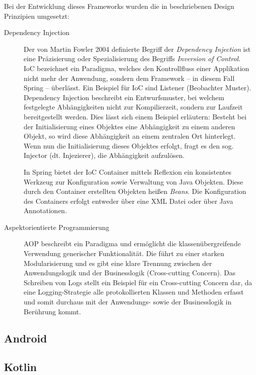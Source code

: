 			Bei der Entwicklung dieses Frameworks wurden die in \cite{Johnson.2003} beschriebenen Design Prinzipien umgesetzt:
			\begin{description}
				\item[Dependency Injection] 
					Der von Martin Fowler 2004 definierte Begriff der \textit{Dependency Injection} ist eine Präzisierung oder Spezialisierung des Begriffs \textit{Inversion of Control}. IoC bezeichnet ein Paradigma, welches den Kontrollfluss einer Applikation nicht mehr der Anwendung, sondern dem Framework -- in diesem Fall Spring -- überlässt. Ein Beispiel für IoC sind Listener (Beobachter Muster). \\
					Dependency Injection beschreibt ein Entwurfsmuster, bei welchem festgelegte Abhängigkeiten nicht zur Kompilierzeit, sondern zur Laufzeit bereitgestellt werden. Dies lässt sich einem Beispiel erläutern: Besteht bei der Initialisierung eines Objektes eine Abhängigkeit zu einem anderen Objekt, so wird diese Abhängigkeit an einem zentralen Ort hinterlegt. Wenn nun die Initialisierung dieses Objektes erfolgt, fragt es den sog. Injector (dt. Injezierer), die Abhängigkeit aufzulösen. \cite{MartinFowler.23.01.2020}
					
					In Spring bietet der IoC Container mittels Reflexion ein konsistentes Werkzeug zur Konfiguration sowie Verwaltung von Java Objekten. Diese durch den Container erstellten Objekten heißen \textit{Beans}. Die Konfiguration des Containers erfolgt entweder über eine XML Datei oder über Java Annotationen. \cite{Walls.20162017} 
				\item[Aspektorientierte Programmierung]
					AOP beschreibt ein Paradigma und ermöglicht die klassenübergreifende Verwendung generischer Funktionalität. Die führt zu einer starken Modularisierung und es gibt eine klare Trennung zwischen der Anwendungslogik und der Businesslogik (Cross-cutting Concern). Das Schreiben von Logs stellt ein Beispiel für ein Cross-cutting Concern dar, da eine Logging-Strategie alle protokollierten Klassen und Methoden erfasst und somit durchaus mit der Anwendungs- sowie der Businesslogik in Berührung kommt. 
			\end{description}
		
		
		
		\subsection{Android}
		
			\subsection{Kotlin}
		
